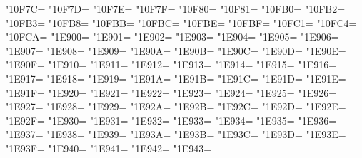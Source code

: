 \XeTeXcharclass"10F7C=\KclassArabD
\XeTeXcharclass"10F7D=\KclassArabD
\XeTeXcharclass"10F7E=\KclassArabD
\XeTeXcharclass"10F7F=\KclassArabD
\XeTeXcharclass"10F80=\KclassArabD
\XeTeXcharclass"10F81=\KclassArabD
\XeTeXcharclass"10FB0=\KclassArabD
\XeTeXcharclass"10FB2=\KclassArabD
\XeTeXcharclass"10FB3=\KclassArabD
\XeTeXcharclass"10FB8=\KclassArabD
\XeTeXcharclass"10FBB=\KclassArabD
\XeTeXcharclass"10FBC=\KclassArabD
\XeTeXcharclass"10FBE=\KclassArabD
\XeTeXcharclass"10FBF=\KclassArabD
\XeTeXcharclass"10FC1=\KclassArabD
\XeTeXcharclass"10FC4=\KclassArabD
\XeTeXcharclass"10FCA=\KclassArabD
\XeTeXcharclass"1E900=\KclassArabD
\XeTeXcharclass"1E901=\KclassArabD
\XeTeXcharclass"1E902=\KclassArabD
\XeTeXcharclass"1E903=\KclassArabD
\XeTeXcharclass"1E904=\KclassArabD
\XeTeXcharclass"1E905=\KclassArabD
\XeTeXcharclass"1E906=\KclassArabD
\XeTeXcharclass"1E907=\KclassArabD
\XeTeXcharclass"1E908=\KclassArabD
\XeTeXcharclass"1E909=\KclassArabD
\XeTeXcharclass"1E90A=\KclassArabD
\XeTeXcharclass"1E90B=\KclassArabD
\XeTeXcharclass"1E90C=\KclassArabD
\XeTeXcharclass"1E90D=\KclassArabD
\XeTeXcharclass"1E90E=\KclassArabD
\XeTeXcharclass"1E90F=\KclassArabD
\XeTeXcharclass"1E910=\KclassArabD
\XeTeXcharclass"1E911=\KclassArabD
\XeTeXcharclass"1E912=\KclassArabD
\XeTeXcharclass"1E913=\KclassArabD
\XeTeXcharclass"1E914=\KclassArabD
\XeTeXcharclass"1E915=\KclassArabD
\XeTeXcharclass"1E916=\KclassArabD
\XeTeXcharclass"1E917=\KclassArabD
\XeTeXcharclass"1E918=\KclassArabD
\XeTeXcharclass"1E919=\KclassArabD
\XeTeXcharclass"1E91A=\KclassArabD
\XeTeXcharclass"1E91B=\KclassArabD
\XeTeXcharclass"1E91C=\KclassArabD
\XeTeXcharclass"1E91D=\KclassArabD
\XeTeXcharclass"1E91E=\KclassArabD
\XeTeXcharclass"1E91F=\KclassArabD
\XeTeXcharclass"1E920=\KclassArabD
\XeTeXcharclass"1E921=\KclassArabD
\XeTeXcharclass"1E922=\KclassArabD
\XeTeXcharclass"1E923=\KclassArabD
\XeTeXcharclass"1E924=\KclassArabD
\XeTeXcharclass"1E925=\KclassArabD
\XeTeXcharclass"1E926=\KclassArabD
\XeTeXcharclass"1E927=\KclassArabD
\XeTeXcharclass"1E928=\KclassArabD
\XeTeXcharclass"1E929=\KclassArabD
\XeTeXcharclass"1E92A=\KclassArabD
\XeTeXcharclass"1E92B=\KclassArabD
\XeTeXcharclass"1E92C=\KclassArabD
\XeTeXcharclass"1E92D=\KclassArabD
\XeTeXcharclass"1E92E=\KclassArabD
\XeTeXcharclass"1E92F=\KclassArabD
\XeTeXcharclass"1E930=\KclassArabD
\XeTeXcharclass"1E931=\KclassArabD
\XeTeXcharclass"1E932=\KclassArabD
\XeTeXcharclass"1E933=\KclassArabD
\XeTeXcharclass"1E934=\KclassArabD
\XeTeXcharclass"1E935=\KclassArabD
\XeTeXcharclass"1E936=\KclassArabD
\XeTeXcharclass"1E937=\KclassArabD
\XeTeXcharclass"1E938=\KclassArabD
\XeTeXcharclass"1E939=\KclassArabD
\XeTeXcharclass"1E93A=\KclassArabD
\XeTeXcharclass"1E93B=\KclassArabD
\XeTeXcharclass"1E93C=\KclassArabD
\XeTeXcharclass"1E93D=\KclassArabD
\XeTeXcharclass"1E93E=\KclassArabD
\XeTeXcharclass"1E93F=\KclassArabD
\XeTeXcharclass"1E940=\KclassArabD
\XeTeXcharclass"1E941=\KclassArabD
\XeTeXcharclass"1E942=\KclassArabD
\XeTeXcharclass"1E943=\KclassArabD

